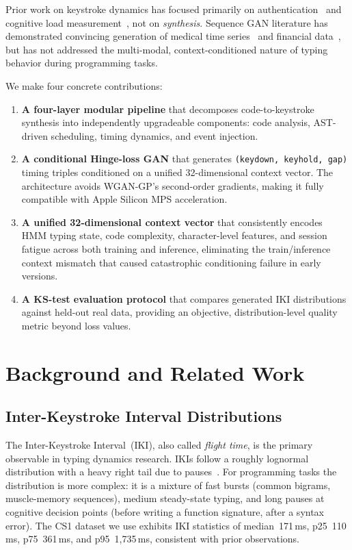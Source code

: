 \documentclass[sigconf,nonacm]{acmart}
\begin{document}
Prior work on keystroke dynamics has focused primarily on authentication~\cite{majaranta2009typing}
and cognitive load measurement~\cite{leiva2021typing}, not on \emph{synthesis}.
Sequence GAN literature has demonstrated convincing generation of medical time
series~\cite{esteban2017rcgan} and financial data~\cite{yoon2019timegan}, but has not
addressed the multi-modal, context-conditioned nature of typing behavior during
programming tasks.

We make four concrete contributions:
\begin{enumerate}
  \item \textbf{A four-layer modular pipeline} that decomposes code-to-keystroke synthesis
    into independently upgradeable components: code analysis, AST-driven scheduling,
    timing dynamics, and event injection.
  \item \textbf{A conditional Hinge-loss GAN} that generates \texttt{(keydown, keyhold, gap)}
    timing triples conditioned on a unified 32-dimensional context vector. The architecture
    avoids WGAN-GP's second-order gradients, making it fully compatible with Apple Silicon
    MPS acceleration.
  \item \textbf{A unified 32-dimensional context vector} that consistently encodes HMM typing
    state, code complexity, character-level features, and session fatigue across both
    training and inference, eliminating the train/inference context mismatch that caused
    catastrophic conditioning failure in early versions.
  \item \textbf{A KS-test evaluation protocol} that compares generated IKI distributions
    against held-out real data, providing an objective, distribution-level quality metric
    beyond loss values.
\end{enumerate}


\section{Background and Related Work}

\subsection{Inter-Keystroke Interval Distributions}

The Inter-Keystroke Interval~(IKI), also called \emph{flight time}, is the primary
observable in typing dynamics research.
IKIs follow a roughly lognormal distribution with a heavy right tail due to
pauses~\cite{majaranta2009typing}.
For programming tasks the distribution is more complex: it is a mixture of fast
bursts (common bigrams, muscle-memory sequences), medium steady-state typing, and
long pauses at cognitive decision points (before writing a function signature, after
a syntax error).
The CS1 dataset we use exhibits IKI statistics of median~171\,ms, p25~110\,ms,
p75~361\,ms, and p95~1{,}735\,ms, consistent with prior observations.
\end{document}
